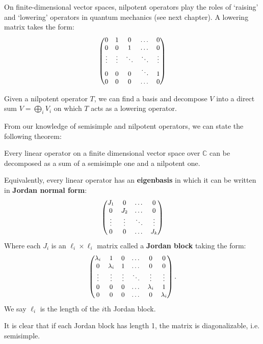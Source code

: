 		
		 On finite-dimensional vector spaces, nilpotent operators play the roles of `raising' and `lowering' operators in quantum mechanics (see next chapter). A lowering matrix takes the form:
		 $$\small \begin{pmatrix}
		 	0 & 1 & 0 & \dots & 0\\
			0 & 0 & 1 & \dots & 0\\
			\vdots & \vdots & \ddots & \ddots & \vdots\\
			0 & 0 & 0 & \ddots & 1\\
			0 & 0 & 0 & \dots & 0
		 \end{pmatrix}$$
		
		\begin{theorem}
			Given a nilpotent operator $T$, we can find a basis and decompose $V$ into a direct sum $V = \bigoplus_{i} V_i$ on which $T$ acts as a lowering operator.
		\end{theorem}
		
		
		From our knowledge of semisimple and nilpotent operators, we can state the following theorem:
		\begin{theorem}
			Every linear operator on a finite dimensional vector space over $\mathbb C$ can be decomposed as a sum of a semisimple one and a nilpotent one. 
			
			Equivalently, every linear operator has an \textbf{eigenbasis} in which it can be written in \textbf{Jordan normal form}:
			\begin{equation}\small
				\begin{pmatrix}
					J_1 & 0 & \dots & 0 \\
					0 & J_2 & \dots & 0\\
					\vdots & \vdots & \ddots & \vdots\\
					0 & 0 & \dots & J_k \\
				\end{pmatrix}
			\end{equation}
			Where each $J_i$ is an $\ell_i \times \ell_i$ matrix called a \textbf{Jordan block} taking the form:
			\begin{equation}\small
				\begin{pmatrix}
					\lambda_i & 1 & 0 & \dots & 0 & 0 \\
					0 & \lambda_i & 1 & \dots & 0 &0 \\
					\vdots & \vdots & \vdots & \ddots & \vdots & \vdots\\
					0 & 0 & 0 & \dots & \lambda_i & 1 \\
					0 & 0 & 0 &\dots & 0 & \lambda _i
				\end{pmatrix}.
			\end{equation}
			We say $\ell_i$ is the length of the $i$th Jordan block.
			
			It is clear that if each Jordan block has length 1, the matrix is diagonalizable, i.e. semisimple.
		\end{theorem}


